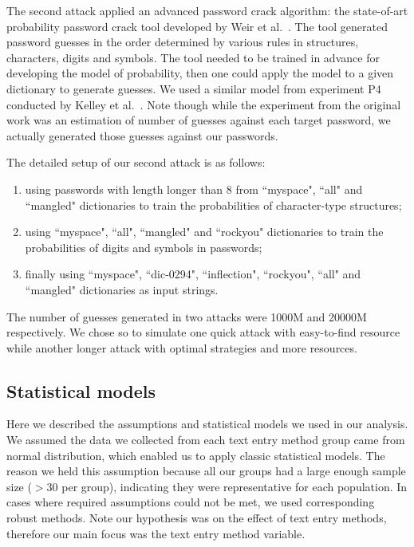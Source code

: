 \documentclass[conference]{IEEEtran}
\begin{document}
The second attack applied an advanced password crack algorithm: the state-of-art probability password crack tool developed by Weir et al.~\cite{Weir:2009:PCU:1607723.1608146, Weir:2010:TMP:1866307.1866327}. The tool generated password guesses in the order determined by various rules in structures, characters, digits and symbols.
The tool needed to be trained in advance for developing the model of probability, then one could apply the model to a given dictionary to generate guesses. We used a similar model from experiment P4 conducted by Kelley et al.~\cite{Kelley:2012:GAM:2310656.2310715}. Note though while the experiment from the original work was an estimation of number of guesses against each target password, we actually generated those guesses against our passwords. 

The detailed setup of our second attack is as follows: 

\begin{enumerate}
\item using passwords with length longer than 8 from ``myspace", ``all" and ``mangled" dictionaries to train the probabilities of character-type structures;
\item using ``myspace", ``all", ``mangled" and ``rockyou" dictionaries to train the probabilities of digits and symbols in passwords;
\item finally using ``myspace", ``dic-0294", ``inflection", ``rockyou", ``all" and ``mangled" dictionaries as input strings.
\end{enumerate}

The number of guesses generated in two attacks were 1000M and 20000M respectively. We chose so to simulate one quick attack with easy-to-find resource while another longer attack with optimal strategies and more resources.

\subsection{Statistical models}

Here we described the assumptions and statistical models we used in our analysis. We assumed the data we collected from each text entry method group came from normal distribution, which enabled us to apply classic statistical models. The reason we held this assumption because all our groups had a large enough sample size ($>30$ per group), indicating they were representative for each population. In cases where required assumptions could not be met, we used corresponding robust methods. Note our hypothesis was on the effect of text entry methods, therefore our main focus was the text entry method variable.
\end{document}
